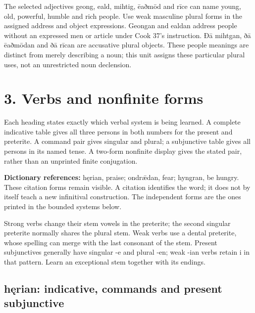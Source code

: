 The selected adjectives geong, eald, mihtig, ēaðmōd and rīce can name young, old, powerful, humble and rich people. Use weak masculine plural forms in the assigned address and object expressions. Geongan and ealdan address people without an expressed men or article under Cook 37’s instruction. Ðā mihtgan, ðā ēaðmōdan and ðā rīcan are accusative plural objects. These people meanings are distinct from merely describing a noun; this unit assigns these particular plural uses, not an unrestricted noun declension.

\section*{3. Verbs and nonfinite forms}

Each heading states exactly which verbal system is being learned. A complete indicative table gives all three persons in both numbers for the present and preterite. A command pair gives singular and plural; a subjunctive table gives all persons in its named tense. A two-form nonfinite display gives the stated pair, rather than an unprinted finite conjugation.

\textbf{Dictionary references:} hęrian, praise; ondrǣdan, fear; hyngran, be hungry. These citation forms remain visible. A citation identifies the word; it does not by itself teach a new infinitival construction. The independent forms are the ones printed in the bounded systems below.

Strong verbs change their stem vowels in the preterite; the second singular preterite normally shares the plural stem. Weak verbs use a dental preterite, whose spelling can merge with the last consonant of the stem. Present subjunctives generally have singular -e and plural -en; weak -ian verbs retain i in that pattern. Learn an exceptional stem together with its endings.

\subsection*{hęrian: indicative, commands and present subjunctive}

